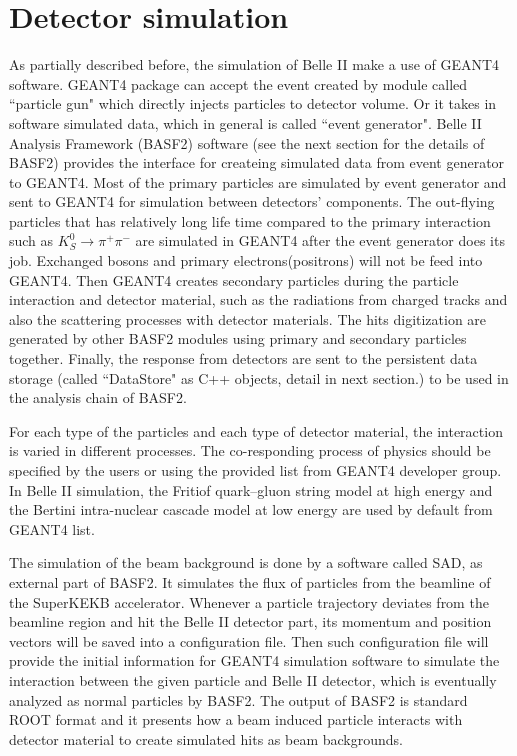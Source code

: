 \section{Detector simulation}
As partially described before, the simulation of Belle II make a use of GEANT4 software. GEANT4 package can accept the event created by module called ``particle gun" which directly injects particles to detector volume. Or it takes in software simulated data, which in general is called ``event generator". Belle II Analysis Framework (BASF2) software (see the next section for the details of BASF2) provides the interface for createing simulated data from event generator to GEANT4. Most of the primary particles are simulated by event generator and sent to GEANT4 for simulation between detectors' components. The out-flying particles that has relatively long life time compared to the primary interaction such as $K_S^0 \to \pi^+ \pi^-$ are simulated in GEANT4 after the event generator does its job. Exchanged bosons and primary electrons(positrons) will not be feed into GEANT4. Then GEANT4 creates secondary particles during the particle interaction and detector material, such as the radiations from charged tracks and also the scattering processes with detector materials. The hits digitization are generated by other BASF2 modules using primary and secondary particles together. Finally, the response from detectors are sent to the persistent data storage (called ``DataStore" as C++ objects, detail in next section.) to be used in the analysis chain of BASF2. 

For each type of the particles and each type of detector material, the interaction is varied in different processes. The co-responding process of physics should be specified by the users or using the provided list from GEANT4 developer group. In Belle II simulation, the
Fritiof quark–gluon string model at high energy and the Bertini intra-nuclear cascade model at low
energy are used by default from GEANT4 list. 

The simulation of the beam background is done by a software called SAD, as external part of BASF2. It simulates the flux of particles from the beamline of the SuperKEKB accelerator. Whenever a particle trajectory deviates from the beamline region and hit the Belle II detector part, its momentum and position vectors will be saved into a configuration file. Then such configuration file will provide the initial information for GEANT4 simulation software to simulate the interaction between the given particle and Belle II detector, which is eventually analyzed as normal particles by BASF2.
The output of BASF2 is standard ROOT format and it presents how a beam induced particle interacts with detector material to create simulated hits as beam backgrounds. 

